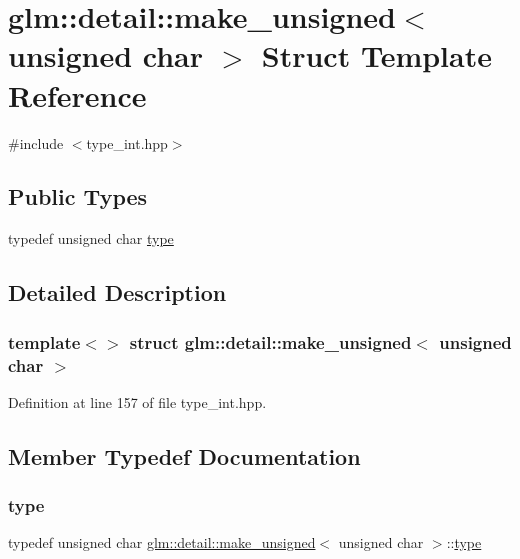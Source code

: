 \hypertarget{structglm_1_1detail_1_1make__unsigned_3_01unsigned_01char_01_4}{}\section{glm\+::detail\+::make\+\_\+unsigned$<$ unsigned char $>$ Struct Template Reference}
\label{structglm_1_1detail_1_1make__unsigned_3_01unsigned_01char_01_4}


{\ttfamily \#include $<$type\+\_\+int.\+hpp$>$}

\subsection*{Public Types}
\begin{DoxyCompactItemize}
\item 
typedef unsigned char \mbox{\hyperlink{structglm_1_1detail_1_1make__unsigned_3_01unsigned_01char_01_4_a783a55dc0559d4b972a0d85cf08256f2}{type}}
\end{DoxyCompactItemize}


\subsection{Detailed Description}
\subsubsection*{template$<$$>$\newline
struct glm\+::detail\+::make\+\_\+unsigned$<$ unsigned char $>$}



Definition at line 157 of file type\+\_\+int.\+hpp.



\subsection{Member Typedef Documentation}
\mbox{\label{structglm_1_1detail_1_1make__unsigned_3_01unsigned_01char_01_4_a783a55dc0559d4b972a0d85cf08256f2}} 
\subsubsection{\texorpdfstring{type}{type}}
{\footnotesize\ttfamily typedef unsigned char \mbox{\hyperlink{structglm_1_1detail_1_1make__unsigned}{glm\+::detail\+::make\+\_\+unsigned}}$<$ unsigned char $>$\+::\mbox{\hyperlink{structglm_1_1detail_1_1make__unsigned_3_01unsigned_01char_01_4_a783a55dc0559d4b972a0d85cf08256f2}{type}}}



